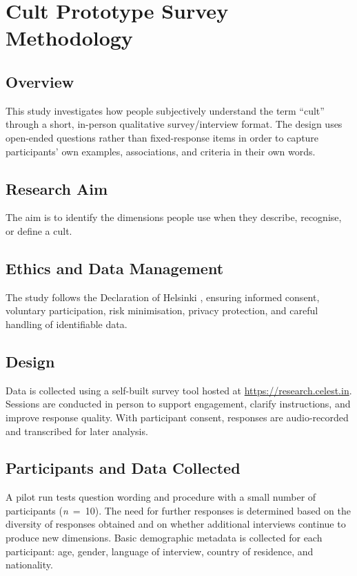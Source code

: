 \chapter{Cult Prototype Survey Methodology}\label{ch:survey_methodology}

\section{Overview}
This study investigates how people subjectively understand the term \enquote{cult} through a short, in-person qualitative survey/interview format. The design uses open-ended questions rather than fixed-response items in order to capture participants' own examples, associations, and criteria in their own words.

\section{Research Aim}
The aim is to identify the dimensions people use when they describe, recognise, or define a cult.

\section{Ethics and Data Management}
The study follows the Declaration of Helsinki \parencite{wmaDeclarationHelsinki2013}, ensuring informed consent, voluntary participation, risk minimisation, privacy protection, and careful handling of identifiable data.

\section{Design}
Data is collected using a self-built survey tool hosted at \url{https://research.celest.in}. Sessions are conducted in person to support engagement, clarify instructions, and improve response quality. With participant consent, responses are audio-recorded and transcribed for later analysis.

\section{Participants and Data Collected}
A pilot run tests question wording and procedure with a small number of participants (\textit{n}~=~10). The need for further responses is determined based on the diversity of responses obtained and on whether additional interviews continue to produce new dimensions. Basic demographic metadata is collected for each participant: age, gender, language of interview, country of residence, and nationality.

